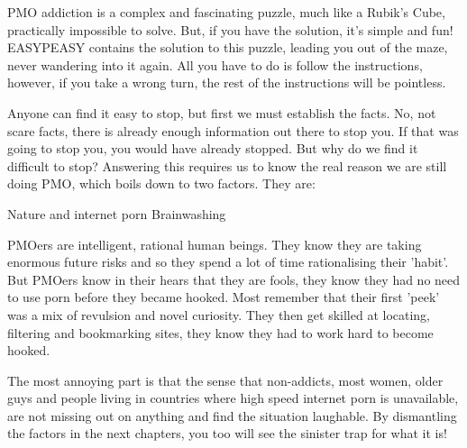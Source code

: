 PMO addiction is a complex and fascinating puzzle, much like a Rubik's Cube, practically impossible to solve. But, if you have the solution, it's simple and fun! EASYPEASY contains the solution to this puzzle, leading you out of the maze, never wandering into it again. All you have to do is follow the instructions, however, if you take a wrong turn, the rest of the instructions will be pointless.

Anyone can find it easy to stop, but first we must establish the facts. No, not scare facts, there is already enough information out there to stop you. If that was going to stop you, you would have already stopped. But why do we find it difficult to stop? Answering this requires us to know the real reason we are still doing PMO, which boils down to two factors. They are:

Nature and internet porn
Brainwashing

PMOers are intelligent, rational human beings. They know they are taking enormous future risks and so they spend a lot of time rationalising their 'habit'. But PMOers know in their hears that they are fools, they know they had no need to use porn before they became hooked. Most remember that their first 'peek' was a mix of revulsion and novel curiosity. They then get skilled at locating, filtering and bookmarking sites, they know they had to work hard to become hooked.

The most annoying part is that the sense that non-addicts, most women, older guys and people living in countries where high speed internet porn is unavailable, are not missing out on anything and find the situation laughable. By dismantling the factors in the next chapters, you too will see the sinister trap for what it is!
